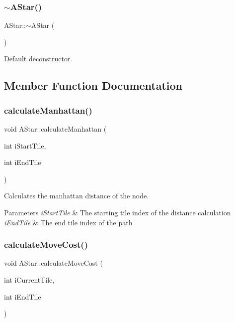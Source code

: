 \subsubsection{\texorpdfstring{$\sim$\+A\+Star()}{~AStar()}}
{\footnotesize\ttfamily A\+Star\+::$\sim$\+A\+Star (\begin{DoxyParamCaption}{ }\end{DoxyParamCaption})}



Default deconstructor. 



\subsection{Member Function Documentation}
\mbox{\label{class_a_star_ab2e6d1c09df20a033d7277f01be1bc6f}} 
\subsubsection{\texorpdfstring{calculate\+Manhattan()}{calculateManhattan()}}
{\footnotesize\ttfamily void A\+Star\+::calculate\+Manhattan (\begin{DoxyParamCaption}\item[{int}]{i\+Start\+Tile,  }\item[{int}]{i\+End\+Tile }\end{DoxyParamCaption})}



Calculates the manhattan distance of the node. 


\begin{DoxyParams}{Parameters}
{\em i\+Start\+Tile} & The starting tile index of the distance calculation \\
\hline
{\em i\+End\+Tile} & The end tile index of the path \\
\hline
\end{DoxyParams}
\mbox{\label{class_a_star_aef82b1b0f07102dad84ad01697878b5c}} 
\subsubsection{\texorpdfstring{calculate\+Move\+Cost()}{calculateMoveCost()}}
{\footnotesize\ttfamily void A\+Star\+::calculate\+Move\+Cost (\begin{DoxyParamCaption}\item[{int}]{i\+Current\+Tile,  }\item[{int}]{i\+End\+Tile }\end{DoxyParamCaption})}




